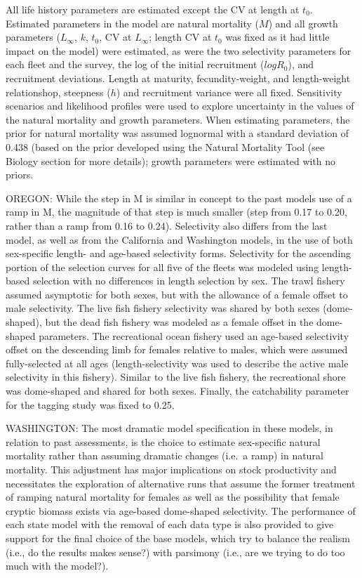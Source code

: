 \documentclass[11pt,
  english,
  letterpaper,
]{article}
\begin{document}
All life history parameters are estimated except the CV at length at \(t_0\). Estimated parameters in the model are natural mortality (\(M\)) and all growth parameters (\(L_{\infty}\), \(k\), \(t_0\), CV at \(L_{\infty}\); length CV at \(t_0\) was fixed as it had little impact on the model) were estimated, as were the two selectivity parameters for each fleet and the survey, the log of the initial recruitment (\(logR_0\)), and recruitment deviations. Length at maturity, fecundity-weight, and length-weight relationshop, steepness (\(h\)) and recruitment variance were all fixed. Sensitivity scenarios and likelihood profiles were used to explore uncertainty in the values of the natural mortality and growth parameters. When estimating parameters, the prior for natural mortality was assumed lognormal with a standard deviation of 0.438 (based on the prior developed using the Natural Mortality Tool (see Biology section for more details); growth parameters were estimated with no priors.

OREGON: While the step in M is similar in concept to the past models use of a ramp in M, the magnitude of that step is much smaller (step from 0.17 to 0.20, rather than a ramp from 0.16 to 0.24). Selectivity also differs from the last model, as well as from the California and Washington models, in the use of both sex-specific length- and age-based selectivity forms. Selectivity for the ascending portion of the selection curves for all five of the fleets was modeled using length-based selection with no differences in length selection by sex. The trawl fishery assumed asymptotic for both sexes, but with the allowance of a female offset to male selectivity. The live fish fishery selectivity was shared by both sexes (dome-shaped), but the dead fish fishery was modeled as a female offset in the dome-shaped parameters. The recreational ocean fishery used an age-based selectivity offset on the descending limb for females relative to males, which were assumed fully-selected at all ages (length-selectivity was used to describe the active male selectivity in this fishery). Similar to the live fish fishery, the recreational shore was dome-shaped and shared for both sexes. Finally, the catchability parameter for the tagging study was fixed to 0.25.

WASHINGTON: The most dramatic model specification in these models, in relation to past assessments, is the choice to estimate sex-specific natural mortality rather than assuming dramatic changes (i.e.~a ramp) in natural mortality. This adjustment has major implications on stock productivity and necessitates the exploration of alternative runs that assume the former treatment of ramping natural mortality for females as well as the possibility that female cryptic biomass exists via age-based dome-shaped selectivity. The performance of each state model with the removal of each data type is also provided to give support for the final choice of the base models, which try to balance the realism (i.e., do the results makes sense?) with parsimony (i.e., are we trying to do too much with the model?).
\end{document}
